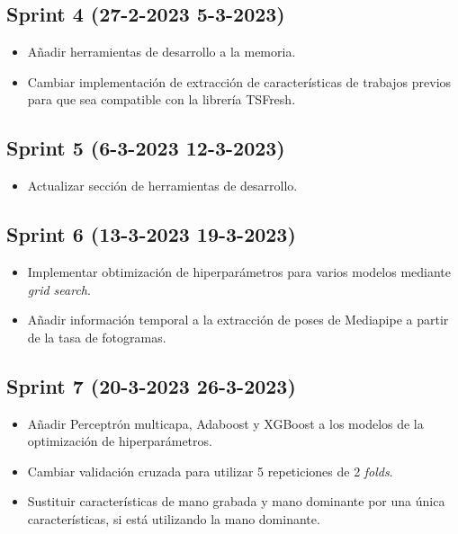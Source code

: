 \subsection{Sprint 4 (27-2-2023  5-3-2023)}

\begin{itemize}
    \item Añadir herramientas de desarrollo a la memoria.
    \item Cambiar implementación de extracción de características de trabajos
          previos para que sea compatible con la librería TSFresh.
\end{itemize}

\subsection{Sprint 5 (6-3-2023  12-3-2023)}

\begin{itemize}
    \item Actualizar sección de herramientas de desarrollo.
\end{itemize}

\subsection{Sprint 6 (13-3-2023  19-3-2023)}

\begin{itemize}
    \item Implementar obtimización de hiperparámetros para varios modelos
          mediante \textit{grid search}.
    \item Añadir información temporal a la extracción de poses de Mediapipe a
          partir de la tasa de fotogramas.
\end{itemize}

\subsection{Sprint 7 (20-3-2023  26-3-2023)}

\begin{itemize}
    \item Añadir Perceptrón multicapa, Adaboost y XGBoost a los modelos de la
          optimización de hiperparámetros.
    \item Cambiar validación cruzada para utilizar 5 repeticiones de 2 \textit{folds}.
    \item Sustituir características de mano grabada y mano dominante por una
          única características, si está utilizando la mano dominante.
\end{itemize}

